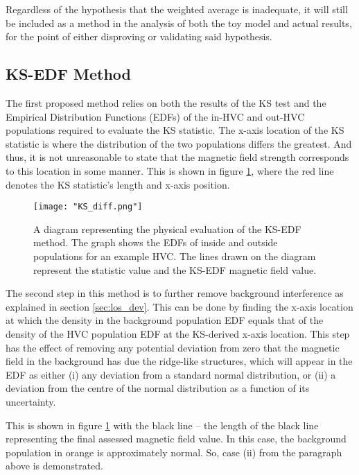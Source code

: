 Regardless of the hypothesis that the weighted average is inadequate, it will still be included as a method in the analysis of both the toy model and actual results, for the point of either disproving or validating said hypothesis.


\subsection{KS-EDF Method}
\label{ssec:KS_EDF}

The first proposed method relies on both the results of the KS test and the Empirical Distribution Functions (EDFs) of the in-HVC and out-HVC populations required to evaluate the KS statistic. The x-axis location of the KS statistic is where the distribution of the two populations differs the greatest. And thus, it is not unreasonable to state that the magnetic field strength corresponds to this location in some manner. This is shown in figure \ref{fig:KSdiff}, where the red line denotes the KS statistic's length and x-axis position.


\begin{figure}
    \texttt{[image: "KS\_diff.png"]}
    \centering
    \caption{A diagram representing the physical evaluation of the KS-EDF method. The graph shows the EDFs of inside and outside populations for an example HVC. The lines drawn on the diagram represent the statistic value and the KS-EDF magnetic field value.}
    \label{fig:KSdiff}
\end{figure}

The second step in this method is to further remove background interference as explained in section \ref{sec:los_dev}. This can be done by finding the x-axis location at which the density in the background population EDF equals that of the density of the HVC population EDF at the KS-derived x-axis location. This step has the effect of removing any potential deviation from zero that the magnetic field in the background has due the ridge-like structures, which will appear in the EDF as either (i) any deviation from a standard normal distribution, or (ii) a deviation from the centre of the normal distribution as a function of its uncertainty.


This is shown in figure \ref{fig:KSdiff} with the black line – the length of the black line representing the final assessed magnetic field value. In this case, the background population in orange is approximately normal. So, case (ii) from the paragraph above is demonstrated.



